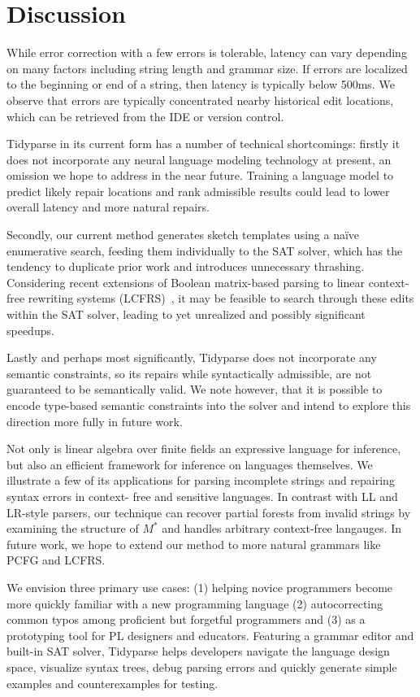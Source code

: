\documentclass[sigplan,review,anonymous,acmsmall]{acmart}\settopmatter{printfolios=false,printccs=false,printacmref=false}
\begin{document}
\section{Discussion}\label{sec:discussion}

While error correction with a few errors is tolerable, latency can vary depending on many factors including string length and grammar size. If errors are localized to the beginning or end of a string, then latency is typically below 500ms. We observe that errors are typically concentrated nearby historical edit locations, which can be retrieved from the IDE or version control.

Tidyparse in its current form has a number of technical shortcomings: firstly it does not incorporate any neural language modeling technology at present, an omission we hope to address in the near future. Training a language model to predict likely repair locations and rank admissible results could lead to lower overall latency and more natural repairs.

Secondly, our current method generates sketch templates using a na\"ive enumerative search, feeding them individually to the SAT solver, which has the tendency to duplicate prior work and introduces unnecessary thrashing. Considering recent extensions of Boolean matrix-based parsing to linear context-free rewriting systems (LCFRS)~\cite{cohen2016parsing}, it may be feasible to search through these edits within the SAT solver, leading to yet unrealized and possibly significant speedups.

Lastly and perhaps most significantly, Tidyparse does not incorporate any semantic constraints, so its repairs while syntactically admissible, are not guaranteed to be semantically valid. We note however, that it is possible to encode type-based semantic constraints into the solver and intend to explore this direction more fully in future work.

Not only is linear algebra over finite fields an expressive language for inference, but also an efficient framework for inference on languages themselves. We illustrate a few of its applications for parsing incomplete strings and repairing syntax errors in context- free and sensitive languages. In contrast with LL and LR-style parsers, our technique can recover partial forests from invalid strings by examining the structure of $M^*$ and handles arbitrary context-free langauges. In future work, we hope to extend our method to more natural grammars like PCFG and LCFRS.

We envision three primary use cases: (1) helping novice programmers become more quickly familiar with a new programming language (2) autocorrecting common typos among proficient but forgetful programmers and (3) as a prototyping tool for PL designers and educators. Featuring a grammar editor and built-in SAT solver, Tidyparse helps developers navigate the language design space, visualize syntax trees, debug parsing errors and quickly generate simple examples and counterexamples for testing. %
\end{document}
